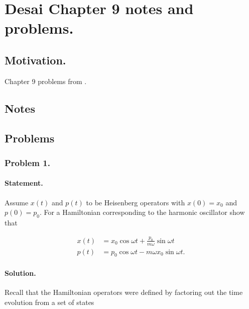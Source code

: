 %
%

\chapter{Desai Chapter 9 notes and problems.}
\label{chap:desaiCh9}
{}
\date{Nov 19, 2010}

\beginArtWithToc

\section{Motivation.}

Chapter 9 problems from \cite{desai2009quantum}.

\section{Notes}
\section{Problems}

\subsection{Problem 1.}
\subsubsection{Statement.}

Assume $x(t)$ and $p(t)$ to be Heisenberg operators with $x(0) = x_0$ and $p(0) = p_0$.  For a Hamiltonian corresponding to the harmonic oscillator show that 

\begin{align}\label{eqn:desaiCh9:100}
x(t) &= x_0 \cos \omega t + \frac{p_0}{m \omega} \sin \omega t \\
p(t) &= p_0 \cos \omega t - m \omega x_0 \sin \omega t.
\end{align}

\subsubsection{Solution.}

Recall that the Hamiltonian operators were defined by factoring out the time evolution from a set of states

